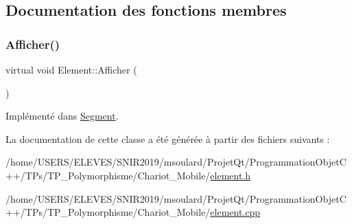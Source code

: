 \subsection{Documentation des fonctions membres}
\mbox{\label{class_element_aa6fe26841512814e1e838c14c692daf0}} 
\subsubsection{\texorpdfstring{Afficher()}{Afficher()}}
{\footnotesize\ttfamily virtual void Element\+::\+Afficher (\begin{DoxyParamCaption}{ }\end{DoxyParamCaption})\hspace{0.3cm}{\ttfamily [pure virtual]}}



Implémenté dans \hyperlink{class_segment_a1ec3ffd47a383755b4f0a51311a5c7d7}{Segment}.



La documentation de cette classe a été générée à partir des fichiers suivants \+:\begin{DoxyCompactItemize}
\item 
/home/\+U\+S\+E\+R\+S/\+E\+L\+E\+V\+E\+S/\+S\+N\+I\+R2019/msoulard/\+Projet\+Qt/\+Programmation\+Objet\+C++/\+T\+Ps/\+T\+P\+\_\+\+Polymorphisme/\+Chariot\+\_\+\+Mobile/\hyperlink{element_8h}{element.\+h}\item 
/home/\+U\+S\+E\+R\+S/\+E\+L\+E\+V\+E\+S/\+S\+N\+I\+R2019/msoulard/\+Projet\+Qt/\+Programmation\+Objet\+C++/\+T\+Ps/\+T\+P\+\_\+\+Polymorphisme/\+Chariot\+\_\+\+Mobile/\hyperlink{element_8cpp}{element.\+cpp}\end{DoxyCompactItemize}
